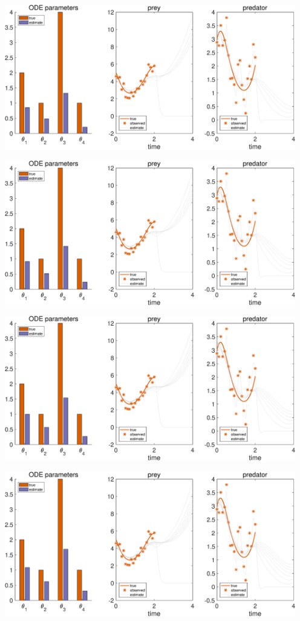 {\includegraphics [width=5in]{Lotka_Volterra_3_09.eps}

\includegraphics [width=5in]{Lotka_Volterra_3_10.eps}

\includegraphics [width=5in]{Lotka_Volterra_3_11.eps}

\includegraphics [width=5in]{Lotka_Volterra_3_12.eps}

}
